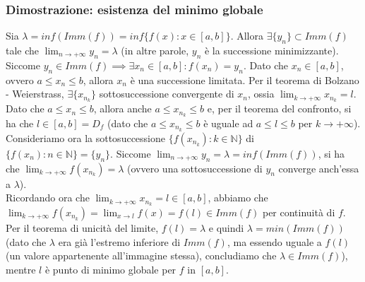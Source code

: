 \documentclass{article}
\begin{document}
\subsubsection{Dimostrazione: esistenza del minimo globale}
Sia $\lambda = inf(Imm(f)) = inf\{f(x) : x \in [a, b]\}$. Allora $\exists \{y_n\} \subset Imm(f)$ tale che $\lim_{n \to +\infty} y_n = \lambda$ (in altre parole, $y_n$ è la successione minimizzante).\\
Siccome $y_n \in Imm(f) \implies \exists x_n \in [a, b] : f(x_n) = y_n$. Dato che $x_n \in [a, b]$, ovvero $a \leq x_n \leq b$, allora $x_n$ è una successione limitata. Per il teorema di Bolzano - Weierstrass, $\exists \{x_{n_k}\}$ sottosuccessione convergente di $x_n$, ossia $\lim_{k \to +\infty} x_{n_k} = l$.\\
Dato che $a \leq x_n \leq b$, allora anche $a \leq x_{n_k} \leq b$ e, per il teorema del confronto, si ha che $l \in [a, b] = D_f$ (dato che $a \leq x_{n_k} \leq b$ è uguale ad $a \leq l \leq b$ per $k \to +\infty$).\\
Consideriamo ora la sottosuccessione $\{f(x_{n_k}) : k \in \mathbb{N}\}$ di $\{f(x_n) : n \in \mathbb{N}\} = \{y_n\}$. Siccome $\lim_{n \to +\infty} y_n = \lambda = inf(Imm(f))$, si ha che $\lim_{k \to +\infty} f(x_{n_k}) = \lambda$ (ovvero una sottosuccessione di $y_n$ converge anch'essa a $\lambda$). \\
Ricordando ora che $\lim_{k \to +\infty} x_{n_k} = l \in [a, b]$, abbiamo che $\lim_{k \to +\infty} f(x_{n_k}) = \lim_{x \to l} f(x) = f(l) \in Imm(f)$ per continuità di $f$.\\
Per il teorema di unicità del limite, $f(l) = \lambda$ e quindi $\lambda = min(Imm(f))$ (dato che $\lambda$ era già l'estremo inferiore di $Imm(f)$, ma essendo uguale a $f(l)$ (un valore appartenente all'immagine stessa), concludiamo che $\lambda \in Imm(f)$), mentre $l$ è punto di minimo globale per $f$ in $[a, b]$.
\end{document}
